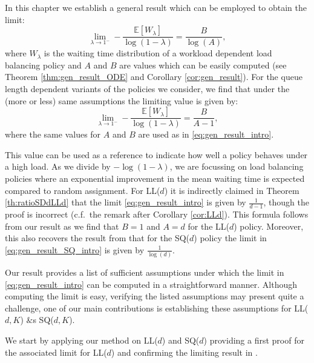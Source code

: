 \documentclass[12pt]{report}
\newcommand{\E}{\mathbb{E}}
\begin{document}
In this chapter we establish a general result which can be employed to obtain the limit: 
\begin{equation} \label{eq:gen_result_SQ_intro}
\lim_{\lambda \rightarrow 1^-} -\frac{\E[W_\lambda]}{\log(1-\lambda)} = \frac{B}{\log(A)},
\end{equation}
where $W_\lambda$ is the waiting time distribution of a workload dependent load balancing policy and $A$ and $B$ are values which can be easily computed (see Theorem \ref{thm:gen_result_ODE} and Corollary \ref{cor:gen_result}). For the queue length dependent variants of the policies we consider, we find that under the (more or less) same assumptions the limiting value is given by:
\begin{equation} \label{eq:gen_result_intro} 
\lim_{\lambda \rightarrow 1^-} -\frac{\E[W_\lambda]}{\log(1-\lambda)} = \frac{B}{A-1},
\end{equation}
where the same values for $A$ and $B$ are used as in \eqref{eq:gen_result_intro}.

This value can be used as a reference to indicate how well a policy behaves under a high load.
As we divide by $-\log(1-\lambda)$, we are focussing on load balancing policies where
an exponential improvement in the mean waiting time is expected compared to random assignment.
For LL($d$) it is indirectly claimed in Theorem \ref{th:ratioSDdLLd} that the limit \eqref{eq:gen_result_intro} is given by $\frac{1}{d-1}$, though the proof is incorrect (c.f.~the remark after Corollary \ref{cor:LLd}). This formula follows from our result as we find that $B=1$ and $A=d$ for the LL($d$) policy. Moreover, this also recovers the result from \cite{mitzenmacher2001power} that for the SQ($d$) policy the limit in \eqref{eq:gen_result_SQ_intro} is given by $\frac{1}{\log(d)}$.

Our result  provides  a list of sufficient assumptions under which the
limit in \eqref{eq:gen_result_intro} can be computed in a straightforward manner. Although computing the limit is easy, verifying the listed assumptions may present quite a challenge, one of our main contributions is establishing these assumptions for LL($d,K$) $\&$s SQ($d,K$).

We start by applying our method on LL($d$) and SQ($d$) providing a first proof for the associated limit for LL($d$) and confirming the limiting result in \cite{mitzenmacher2001power}.
\end{document}
